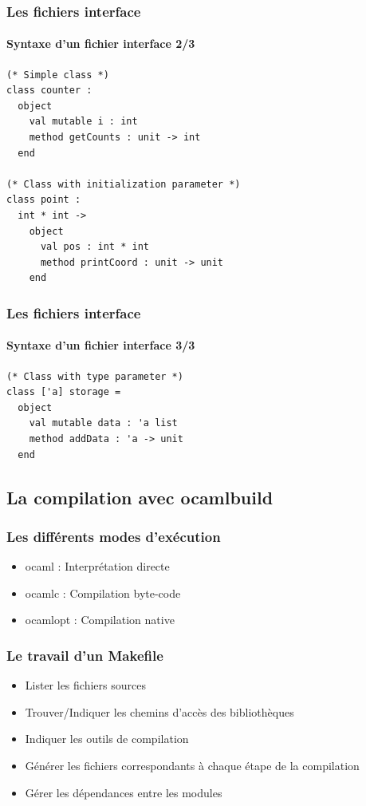 \begin{frame}[fragile]
	\frametitle{Les fichiers interface}
	\framesubtitle{Syntaxe d'un fichier interface 2/3}
	\lstset{basicstyle=\small}
	\begin{lstlisting}
(* Simple class *)
class counter :
  object
    val mutable i : int
    method getCounts : unit -> int
  end

(* Class with initialization parameter *)
class point :
  int * int ->
    object
      val pos : int * int
      method printCoord : unit -> unit
    end
	\end{lstlisting}
\end{frame}

\begin{frame}[fragile]
	\frametitle{Les fichiers interface}
	\framesubtitle{Syntaxe d'un fichier interface 3/3}
	\lstset{basicstyle=\small}
	\begin{lstlisting}
(* Class with type parameter *)
class ['a] storage =
  object
    val mutable data : 'a list
    method addData : 'a -> unit
  end
	\end{lstlisting}
\end{frame}

\subsection{La compilation avec ocamlbuild} %
\begin{frame}[fragile]
	\frametitle{Les différents modes d'exécution}
	\huge
	\begin{itemize}
		\item ocaml : Interprétation directe
		\item ocamlc : Compilation byte-code
		\item ocamlopt : Compilation native
	\end{itemize}
	\normalsize
\end{frame}

\begin{frame}
	\frametitle{Le travail d'un Makefile}
	\begin{center}
		\begin{itemize}
			\item Lister les fichiers sources
			\item Trouver/Indiquer les chemins d'accès des bibliothèques
			\item Indiquer les outils de compilation
			\item Générer les fichiers correspondants à chaque étape de la compilation
			\item Gérer les dépendances entre les modules
		\end{itemize}
	\end{center}
\end{frame}

